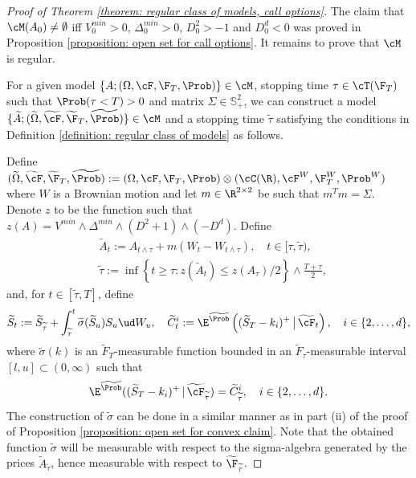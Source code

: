 \documentclass[11pt]{article}
\begin{document}
\begin{proof}[Proof of Theorem \ref{theorem: regular class of models, call options}]

The claim that $\cM(A_0) \neq \emptyset$ iff $V^{min}_0 > 0$, $\Delta^{min}_0 > 0$, $D^2_0 > -1$ and $D^d_0 < 0$ was proved in Proposition \ref{proposition: open set for call options}. It remains to prove that $\cM$ is regular. 

For a given model $\{A ; (\Omega, \cF, \F_T, \Prob) \} \in \cM$, stopping time $\tau \in \cT(\F_T)$ such that $\Prob( \tau < T) > 0$ and matrix $\Sigma \in \mathbb{S}^2_+$, we can construct a model $\{ \widetilde{A} ; (\widetilde{\Omega}, \widetilde{\cF}, \widetilde{\F}_T, \widetilde{\Prob}) \} \in \cM$ and a stopping time $\widetilde{\tau}$ satisfying the conditions in Definition \ref{definition: regular class of models} as follows. 

Define $(\widetilde{\Omega}, \widetilde{\cF},\widetilde{\F}_T,\widetilde{\Prob}) := (\Omega, \cF, \F_T, \Prob) \otimes (\cC(\R), \cF^W, \F^W_T, \Prob^W)$ where $W$ is a Brownian motion and let $m \in \R^{2 \times 2}$ be such that $m^T m = \Sigma$. Denote $z$ to be the function such that $z(A) = V^{min} \wedge \Delta^{min} \wedge (D^2 + 1) \wedge (-D^{d})$. Define
\begin{align*}
&\widetilde{A}_t := A_{t \wedge \tau} + m(W_t - W_{t \wedge \tau}), \quad t \in [\tau, \widetilde{\tau}), \\
%
%
%
& \widetilde{\tau} := \inf \left\{ t \geq \tau: z(\widetilde{A}_t) \leq z(A_\tau)/2 \right\} \wedge \frac{T+\tau}{2},
\end{align*}
and, for $t \in [\widetilde{\tau}, T]$, define
$$
\widetilde{S}_t := \widetilde{S}_{\widetilde{\tau}}  + \int_{\widetilde{\tau}}^t \widetilde{\sigma}(\widetilde{S}_u) S_u \ud W_u, \quad \widetilde{C}^i_t := \E^{\widetilde{\Prob}} \left( (\widetilde{S}_T - k_i)^+ \, \big{|} \, \widetilde{\cF}_t \right), \quad i \in \{2,\ldots,d\},
$$
where $\widetilde{\sigma}(k)$ is an $\widetilde{F}_T$-measurable function bounded in an $\widetilde{F}_\tau$-measurable interval $[l,u] \subset (0,\infty)$ such that
$$
\E^{\widetilde{\Prob}}((\widetilde{S}_T - k_i)^+ \, | \, \widetilde{\cF}_{\widetilde{\tau}} ) = \widetilde{C}^i_{\widetilde{\tau}}, \quad i \in \{2,\ldots,d\}.
$$
The construction of $\widetilde{\sigma}$ can be done in a similar manner as in part (ii) of the proof of Proposition \ref{proposition: open set for convex claim}. Note that the obtained function $\widetilde{\sigma}$ will be measurable with respect to the sigma-algebra generated by the prices $\widetilde{A}_{\widetilde{\tau}}$, hence measurable with respect to $\widetilde{\F}_{\widetilde{\tau}}$.


\end{proof}
\end{document}
